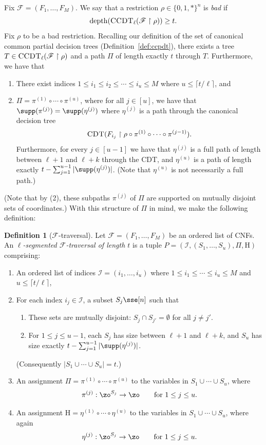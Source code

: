 \documentclass[11pt]{article}
\numberwithin{equation}{section}
\theoremstyle{definition}
\newtheorem{definition}[theorem]{Definition}
\theoremstyle{plain}
\theoremstyle{plain}
\newcommand{\uhr}{\upharpoonright}
\newcommand{\CDT}{\textsc{CDT}}
\newcommand{\CCDT}{\textsc{CCDT}}
\newcommand{\depth}{\mathrm{depth}}
\begin{document}
Fix $\mathscr{F} = (F_1,\ldots,F_M)$.  We say that a restriction $\rho \in \{0,1,\ast\}^n$ is \emph{bad}  if 
\[ \depth(\CCDT_{\ell}(\mathscr{F}\uhr\rho)) \ge t. \] 
Fix $\rho$ to be a bad restriction.
Recalling our definition of the set of canonical common partial decision trees (Definition~\ref{def:ccpdt}), there exists a tree $T \in \CCDT_\ell(\mathscr{F} \uhr \rho)$ and a path $\Pi$ of length exactly $t$ through $T$. Furthermore, we have that 
\begin{enumerate} 
\item There exist indices $1\le i_1 \le i_2 \le \cdots \le i_u \le M$ where $u \le \lceil t/\ell\rceil$, and 
\item $\Pi = \pi^{(1)} \circ \cdots \circ \pi^{(u)}$, where for all $j\in [u]$, we have that $\supp(\pi^{(j)}) =  \supp(\eta^{(j)})$ where  $\eta^{(j)}$ is a path through the canonical decision tree 
\[ \CDT(F_{i_j} \uhr \rho \circ \pi^{(1)}\circ\cdots\circ \pi^{(j-1)}).\]  
Furthermore, for every $j\in [u-1]$ we have that $\eta^{(j)}$ is a full path of length between $\ell+1$ and $\ell+k$ through the CDT, and $\eta^{(u)}$ is a path of length exactly $t - \sum_{j=1}^{u-1} |\supp(\eta^{(j)})|$. (Note that $\eta^{(u)}$ is not necessarily a full path.)
\end{enumerate}  
(Note that by (2), these subpaths $\pi^{(j)}$ of $\Pi$ are supported on mutually disjoint sets of coordinates.) With this structure of  $\Pi$ in mind, we make the following definition: 

\begin{definition}[$\mathscr{F}$-traversal]
\label{def:F-traversal}
Let $\mathscr{F} = (F_1,\ldots,F_M)$ be an ordered list of CNFs.  An \emph{$\ell$-segmented $\mathscr{F}$-traversal of length $t$} is a tuple $P = (\mathscr{I}, (S_1,\ldots,S_u),\Pi,{\mathrm{H}})$  comprising: 
\begin{enumerate}
\item An ordered list of indices $\mathscr{I} = (i_1, \ldots, i_u)$ where $1\le i_1 \le \cdots \le i_u \le M$ and $u \le \lceil t /\ell \rceil$,
\item For each index $i_j \in \mathscr{I}$,  a subset $S_j \sse [n]$ such that 
\begin{enumerate}
\item These sets are mutually disjoint: $S_j \cap S_{j'} = \emptyset$ for all $j\ne j'$.
\item For $1\le j \le u-1$, each $S_j$ has size between $\ell+1$ and $\ell+k$, and $S_u$ has size exactly $t - \sum_{j=1}^{u-1} |\supp(\eta^{(j)})|$.
\end{enumerate} 
(Consequently $|S_1\cup\cdots\cup S_u| =t$.)
\item An assignment $\Pi = \pi^{(1)}\circ\cdots\circ\pi^{(u)}$ to the variables in $S_1 \cup \cdots \cup S_u$, where 
\[ \pi^{(j)} : \zo^{S_j} \to \zo \qquad \text{for $1\le j\le u$.} \] 
\item An assignment $\mathrm{H} = \eta^{(1)}\circ \cdots\circ\eta^{(u)}$ to the variables in $S_1 \cup \cdots \cup S_u$, where again
\[ \eta^{(j)} : \zo^{S_j} \to \zo \qquad \text{for $1\le j\le u$.} \] 
\end{enumerate} 
\end{definition} 
\end{document}
